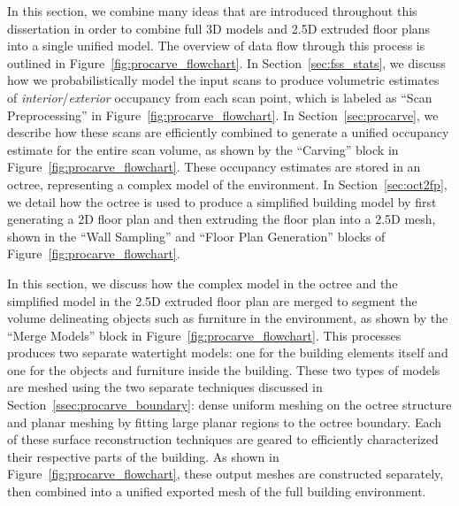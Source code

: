 \documentclass[12pt,onecolumn,oneside]{book}
\begin{document}
In this section, we combine many ideas that are introduced throughout this dissertation in order to combine full 3D models and 2.5D extruded floor plans into a single unified model.  The overview of data flow through this process is outlined in Figure~\ref{fig:procarve_flowchart}.  In Section~\ref{sec:fss_stats}, we discuss how we probabilistically model the input scans to produce volumetric estimates of {\it interior}/{\it exterior} occupancy from each scan point, which is labeled as ``Scan Preprocessing'' in Figure~\ref{fig:procarve_flowchart}.  In Section~\ref{sec:procarve}, we describe how these scans are efficiently combined to generate a unified occupancy estimate for the entire scan volume, as shown by the ``Carving'' block in Figure~\ref{fig:procarve_flowchart}.  These occupancy estimates are stored in an octree, representing a complex model of the environment.  In Section~\ref{sec:oct2fp}, we detail how the octree is used to produce a simplified building model by first generating a 2D floor plan and then extruding the floor plan into a 2.5D mesh, shown in the ``Wall Sampling'' and ``Floor Plan Generation'' blocks of Figure~\ref{fig:procarve_flowchart}.

In this section, we discuss how the complex model in the octree and the simplified model in the 2.5D extruded floor plan are merged to segment the volume delineating objects such as furniture in the environment, as shown by the ``Merge Models'' block in Figure~\ref{fig:procarve_flowchart}.  This processes produces two separate watertight models:  one for the building elements itself and one for the objects and furniture inside the building.  These two types of models are meshed using the two separate techniques discussed in Section~\ref{ssec:procarve_boundary}:  dense uniform meshing on the octree structure and planar meshing by fitting large planar regions to the octree boundary.  Each of these surface reconstruction techniques are geared to efficiently characterized their respective parts of the building.  As shown in Figure~\ref{fig:procarve_flowchart}, these output meshes are constructed separately, then combined into a unified exported mesh of the full building environment.
\end{document}

